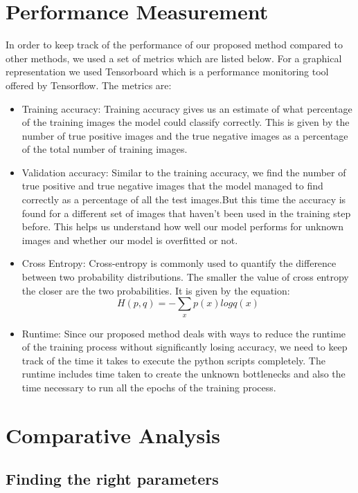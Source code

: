 \documentclass[12pt]{report}
\begin{document}
\section{Performance Measurement}
In order to keep track of the performance of our proposed method compared to other methods, we used a set of metrics which are listed below. For a graphical representation we used Tensorboard which is a performance monitoring tool offered by Tensorflow. The metrics are:
\begin{itemize}
\item Training accuracy: Training accuracy gives us an estimate of what percentage of the training images the model could classify correctly. This is given by the number of  true positive images and the true negative images as a percentage of the total number of training images.

\item Validation accuracy: Similar to the training accuracy, we find the number of true positive and true negative images that the model managed to find correctly as a percentage of all the test images.But this time the accuracy is found for a different set of images that haven't been used in the training step before. This helps us understand how well our model performs for unknown images and whether our model is overfitted or not.

\item Cross Entropy: Cross-entropy is commonly used to quantify the difference between two probability distributions. The smaller the value of cross entropy the closer are the two probabilities. It is given by the equation:
$$
H(p,q)=-\sum_{x}p(x)log q(x)
$$

\item Runtime: Since our proposed method deals with ways to reduce the runtime of the training process without significantly losing accuracy, we need to keep track of the time it takes to execute the python scripts completely. The runtime includes time taken to create the unknown  bottlenecks and also the time necessary to run all the epochs of the training process.
\end{itemize}

\section{Comparative Analysis}
\subsection{Finding the right parameters}
\end{document}
